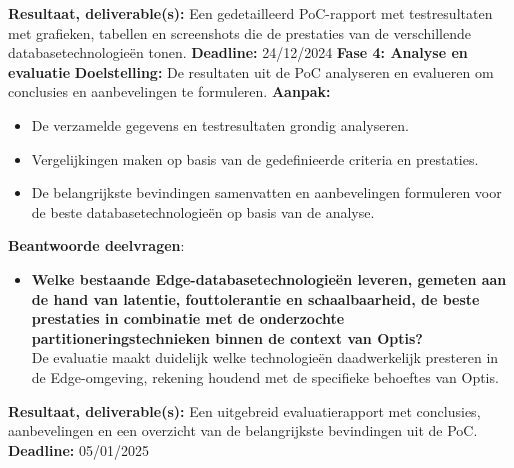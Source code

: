    \textbf{Resultaat, deliverable(s):} Een gedetailleerd PoC-rapport met testresultaten met grafieken, tabellen en screenshots die de prestaties van de verschillende databasetechnologieën tonen.\newline\newline
    \textbf{Deadline:} 24/12/2024\newline\newline
\textbf{Fase 4: Analyse en evaluatie}\newline\newline
    \textbf{Doelstelling:} De resultaten uit de PoC analyseren en evalueren om conclusies en aanbevelingen te formuleren.\newline\newline
    \textbf{Aanpak:}
    \begin{itemize}
        \item De verzamelde gegevens en testresultaten grondig analyseren.
        \item Vergelijkingen maken op basis van de gedefinieerde criteria en prestaties.
        \item De belangrijkste bevindingen samenvatten en aanbevelingen formuleren voor de beste databasetechnologieën op basis van de analyse.\newline
    \end{itemize}
    \textbf{Beantwoorde deelvragen}:
    \begin{itemize}
    \item \textbf{Welke bestaande Edge-databasetechnologieën leveren, gemeten aan de hand van latentie, fouttolerantie en schaalbaarheid, de beste prestaties in combinatie met de onderzochte partitioneringstechnieken binnen de context van Optis?} \\
      De evaluatie maakt duidelijk welke technologieën daadwerkelijk presteren in de Edge-omgeving, rekening houdend met de specifieke behoeftes van Optis.
    \end{itemize}
    \textbf{Resultaat, deliverable(s):} Een uitgebreid evaluatierapport met conclusies, aanbevelingen en een overzicht van de belangrijkste bevindingen uit de PoC.\newline\newline
    \textbf{Deadline:} 05/01/2025\newline\newline

